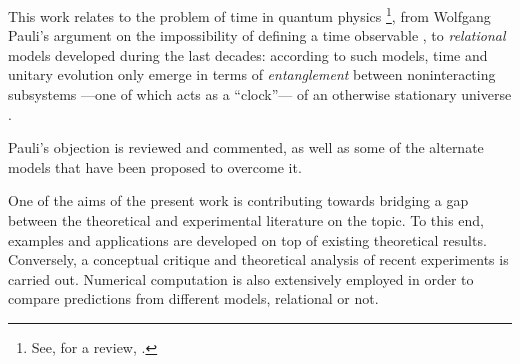 This work relates to the problem of time in quantum physics%
\footnote{
  See, for a review, \cite{TQM1, TQM2}.
},
from Wolfgang Pauli's argument
on the impossibility of defining a time observable \parencite{PauliFootnote},
to \emph{relational} models developed during the last decades:
according to such models,
time and unitary evolution only emerge in
terms of \emph{entanglement} between noninteracting subsystems
---one of which acts as a ``clock''---
of an otherwise stationary universe \parencite{PageWootters, Marletto:Evolution}.

Pauli's objection is reviewed and commented,
as well as some of the alternate models
that have been proposed
to overcome it.

One of the aims of the present work
is contributing towards bridging a gap between the theoretical
and experimental literature on the topic.
To this end, examples and applications are developed on top of existing theoretical results.
Conversely,
a conceptual critique and theoretical analysis
of recent experiments is carried out.
Numerical computation is also extensively employed in order to compare
predictions from different models, relational or not.